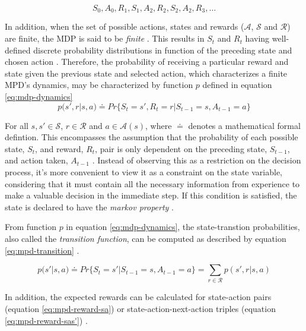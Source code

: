 \documentclass[11pt,a4paper]{article}
\begin{document}
\begin{equation} \label{eq:mpd-sequence}
S_0, A_0, R_1, S_1, A_2, R_2, S_2, A_2, R_3, \dots
\end{equation}

In addition, when the set of possible actions, states and rewards ($\mathcal{A}$, $\mathcal{S}$ and $\mathcal{R}$) are finite, the \ac{MDP} is said to be \textit{finite} \cite{suttonReinforcementLearningIntroduction2014}. This results in $S_t$ and $R_t$ having well-defined discrete probability distributions in function of the preceding state and chosen action \cite{suttonReinforcementLearningIntroduction2014}. Therefore, the probability of receiving a particular reward and state given the previous state and selected action, which characterizes a finite MPD's dynamics, may be characterized by function $p$ defined in equation \ref{eq:mdp-dynamics}
\begin{equation} \label{eq:mdp-dynamics}
p(s',r|s,a) \doteq Pr\{S_t = s', R_t = r | S_{t-1} = s, A_{t-1} = a\}
\end{equation}

For all $s, s' \in \mathcal{S}$, $r \in \mathcal{R}$ and $a \in \mathcal{A}(s)$, where $\doteq$ denotes a mathematical formal defintion. This encompasses the assumption that the probability of each possible state, $S_t$, and reward, $R_t$, pair is only dependent on the preceding state, $S_{t-1}$, and action taken, $A_{t-1}$ \cite{suttonReinforcementLearningIntroduction2014}. Instead of observing this as a restriction on the decision process, it's more convenient to view it as a constraint on the state variable, considering that it must contain all the necessary information from experience to make a valuable decision in the immediate step. If this condition is satisfied, the state is declared to have the \textit{markov property} \cite{suttonReinforcementLearningIntroduction2014}. \par
From function $p$ in equation \ref{eq:mdp-dynamics}, the state-transtion probabilities, also called the \textit{transition function}, can be computed as described by equation \ref{eq:mpd-transition} \cite{suttonReinforcementLearningIntroduction2014, moralesGrokkingDeepReinforcement2020}.

\begin{equation} \label{eq:mpd-transition}
    p(s'|s,a) \doteq Pr\{S_t = s'|S_{t-1} = s, A_{t-1} = a\} = \sum_{r \in \mathcal{R}} p(s',r|s,a)
\end{equation}

In addition, the expected rewards can be calculated for state-action pairs (equation \ref{eq:mpd-reward-sa}) or state-action-next-action triples (equation \ref{eq:mpd-reward-sas'}) \cite{suttonReinforcementLearningIntroduction2014, moralesGrokkingDeepReinforcement2020}.
\end{document}
